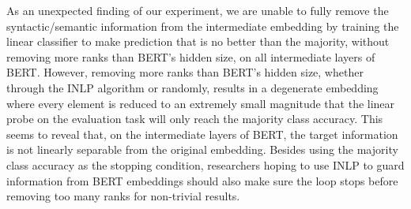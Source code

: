 \documentclass[11pt,a4paper]{article}
\begin{document}
As an unexpected finding of our experiment, we are unable to fully remove the syntactic/semantic information from the intermediate embedding by training the linear classifier to make prediction that is no better than the majority, without removing more ranks than BERT's hidden size, on all intermediate layers of BERT. However, removing more ranks than BERT’s hidden size, whether through the INLP algorithm or randomly, results in a degenerate embedding where every element is reduced to an extremely small magnitude that the linear probe on the evaluation task will only reach the majority class accuracy. This seems to reveal that, on the intermediate layers of BERT, the target information is not linearly separable from the original embedding. Besides using the majority class accuracy as the stopping condition, researchers hoping to use INLP to guard information from BERT embeddings should also make sure the loop stops before removing too many ranks for non-trivial results.




\end{document}
